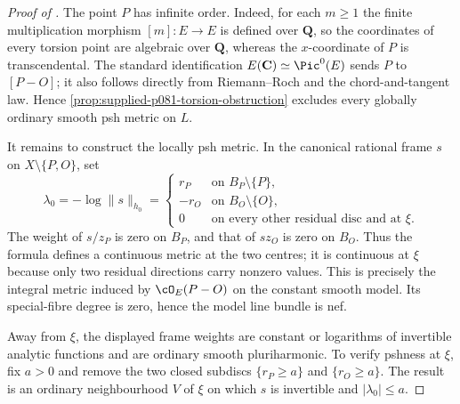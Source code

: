\begin{proof}[Proof of ]
The point $P$ has infinite order.  Indeed, for each $m\geq1$ the finite
multiplication morphism $[m]\colon E\to E$ is defined over $\mathbf Q$, so
the coordinates of every torsion point are algebraic over $\mathbf Q$,
whereas the $x$-coordinate of $P$ is transcendental.  The standard
identification $E(\mathbf C)\simeq\Pic^0(E)$ sends $P$ to $[P-O]$; it also
follows directly from Riemann--Roch and the chord-and-tangent law.  Hence
\cref{prop:supplied-p081-torsion-obstruction} excludes every globally
ordinary smooth psh metric on $L$.

It remains to construct the locally psh metric.  In the canonical rational
frame $s$ on $X\setminus\{P,O\}$, set
\[
 \lambda_0=-\log\|s\|_{h_0}=
 \begin{cases}
 r_P&\text{on }B_P\setminus\{P\},\\
 -r_O&\text{on }B_O\setminus\{O\},\\
 0&\text{on every other residual disc and at }\xi.
 \end{cases}
\]
The weight of $s/z_P$ is zero on $B_P$, and that of $sz_O$ is zero on
$B_O$.  Thus the formula defines a continuous metric at the two centres;
it is continuous at $\xi$ because only two residual directions carry
nonzero values.  This is precisely the integral metric induced by
$\cO_E(P-O)$ on the constant smooth model.  Its special-fibre degree is
zero, hence the model line bundle is nef.

Away from $\xi$, the displayed frame weights are constant or logarithms of
invertible analytic functions and are ordinary smooth pluriharmonic.  To
verify pshness at $\xi$, fix $a>0$ and remove the two closed subdiscs
$\{r_P\geq a\}$ and $\{r_O\geq a\}$.  The result is an ordinary
neighbourhood $V$ of $\xi$ on which $s$ is invertible and
$|\lambda_0|\leq a$.


\end{proof}
